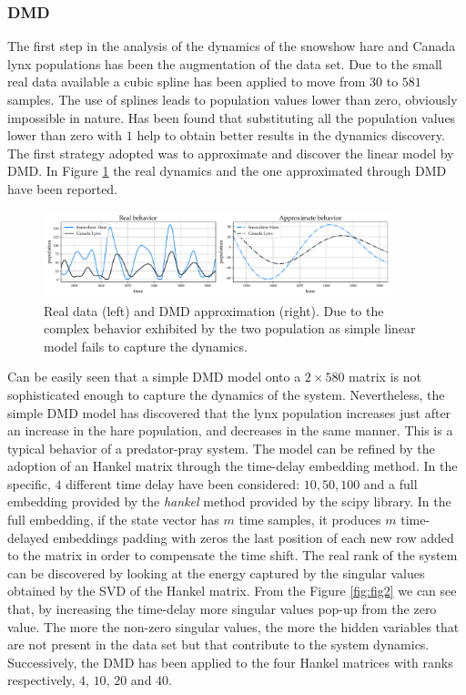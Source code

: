 \documentclass[]{article}
\begin{document}
\subsubsection{DMD}
The first step in the analysis of the dynamics of the snowshow hare and Canada lynx populations has been the augmentation of the data set. Due to the small real data available a cubic spline has been applied to move from $30$ to $581$ samples. The use of splines leads to population values lower than zero, obviously impossible in nature. Has been found that substituting all the population values lower than zero with $1$ help to obtain better results in the dynamics discovery. The first strategy adopted was to approximate and discover the linear model by DMD. In Figure \ref{fig:fig1} the real dynamics and the one approximated through DMD have been reported.
\begin{figure}[!t]
\centering
\includegraphics[width=0.9\textwidth]{../figures/dmd.pdf}
\caption{Real data (left) and DMD approximation (right). Due to the complex behavior exhibited by the two population as simple linear model fails to capture the dynamics.}
\label{fig:fig1}
\end{figure}
Can be easily seen that a simple DMD model onto a $2 \times 580$ matrix is not sophisticated enough to capture the dynamics of the system. Nevertheless, the simple DMD model has discovered that the lynx population increases just after an increase in the hare population, and decreases in the same manner. This is a typical behavior of a predator-pray system. The model can be refined by the adoption of an Hankel matrix through the time-delay embedding method. In the specific, $4$ different time delay have been considered: $10, 50, 100$ and a full embedding provided by the \textit{hankel} method provided by the scipy library. In the full embedding, if the state vector has $m$ time samples, it produces $m$ time-delayed embeddings padding with zeros the last position of each new row added to the matrix in order to compensate the time shift. The real rank of the system can be discovered by looking at the energy captured by the singular values obtained by the SVD of the Hankel matrix. From the Figure \ref{fig:fig2} we can see that, by increasing the time-delay more singular values pop-up from the zero value. The more the non-zero singular values, the more the hidden variables that are not present in the data set but that contribute to the system dynamics. Successively, the DMD has been applied to the four Hankel matrices with ranks respectively, $4$, $10$, $20$ and $40$.
\end{document}
